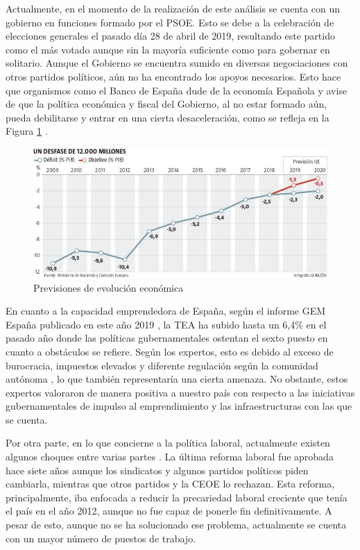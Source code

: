 Actualmente, en el momento de la realización de este análisis se cuenta con un gobierno en funciones formado por el \acf{PSOE}. Esto se debe a la celebración de elecciones generales el pasado día 28 de abril de 2019, resultando este partido como el más votado aunque sin la mayoría suficiente como para gobernar en solitario. Aunque el Gobierno se encuentra sumido en diversas negociaciones con otros partidos políticos, aún no ha encontrado los apoyos necesarios. Esto hace que organismos como el Banco de España dude de la economía Española y avise de que la política económica y fiscal del Gobierno, al no estar formado aún, pueda debilitarse y entrar en una cierta desaceleración, como se refleja en la Figura \ref{fig:evolrazon} \cite{larazon2019}.

\clearpage

\begin{figure}[h]
  \centering
  \includegraphics[width=0.8\linewidth]{figures/images/evolucion_larazon.jpg}
  \caption{Previsiones de evolución económica}
  \label{fig:evolrazon}
\end{figure}

En cuanto a la capacidad emprendedora de España, según el informe \acf{GEM} España publicado en este año 2019 \cite{informegem2019}, la \acf{TEA} ha subido hasta un 6,4\% en el pasado año donde las políticas gubernamentales ostentan el sexto puesto en cuanto a obstáculos se refiere. Según los expertos, esto es debido al exceso de burocracia, impuestos elevados y diferente regulación según la comunidad autónoma \cite{yolandagonzalez2019}, lo que también representaría una cierta amenaza. No obstante, estos expertos valoraron de manera positiva a nuestro país con respecto a las iniciativas gubernamentales de impulso al emprendimiento y las infraestructuras con las que se cuenta.

Por otra parte, en lo que concierne a la política laboral, actualmente existen algunos choques entre varias partes \cite{manuelvgomez2019}. La última reforma laboral fue aprobada hace siete años aunque los sindicatos y algunos partidos políticos piden cambiarla, mientras que otros partidos y la \acf{CEOE} lo rechazan. Esta reforma, principalmente, iba enfocada a reducir la precariedad laboral creciente que tenía el país en el año 2012, aunque no fue capaz de ponerle fin definitivamente. A pesar de esto, aunque no se ha solucionado ese problema, actualmente se cuenta con un mayor número de puestos de trabajo.

